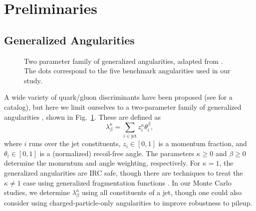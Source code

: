 \documentclass[11pt,letterpaper]{article}
\newcommand{\genang}[2]{{\lambda^{#1}_{#2}}}
\DeclareRobustCommand{\Fig}[1]{Fig.~\ref{#1}}
\begin{document}
\section{Preliminaries}
\label{sec:prelim}

\subsection{Generalized Angularities}

\begin{figure}
\centering
{}
\caption{Two parameter family of generalized angularities, adapted from \cite{Larkoski:2014pca}.  The dots correspond to the five benchmark angularities used in our study.}
\label{fig:lambda_space}
\end{figure}

A wide variety of quark/gluon discriminants have been proposed (see \cite{} for a catalog), but here we limit ourselves to a two-parameter family of generalized angularities \cite{}, shown in \Fig{fig:lambda_space}.  These are defined as
\begin{equation}
\label{eq:genang}
\genang{\kappa}{\beta} = \sum_{i \in \text{jet}} z_i^\kappa \theta_i^\beta,
\end{equation}
where $i$ runs over the jet constituents, $z_i \in [0,1]$ is a momentum fraction, and $\theta_i \in [0,1]$ is a (normalized) recoil-free angle. The parameters $\kappa \ge 0$ and $\beta \ge 0$ determine the momentum and angle weighting, respectively.  For $\kappa = 1$, the generalized angularities are IRC safe, though there are techniques to treat the $\kappa \not= 1$ case using generalized fragmentation functions \cite{Larkoski:2014pca}.  In our Monte Carlo studies, we determine $\genang{\kappa}{\beta}$ using all constituents of a jet, though one could also consider using charged-particle-only angularities to improve robustness to pileup.
\end{document}
